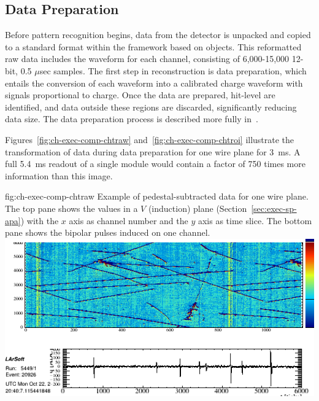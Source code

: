 \subsection{Data Preparation}

Before pattern recognition begins, data from the  detector is
unpacked and copied to a standard format within the  framework based on  objects. 
This reformatted raw data includes the waveform for each channel, consisting of 6,000-15,000  12-bit, 0.5 $\mu$sec samples. 
The first step in reconstruction is data preparation, which entails the conversion of each  waveform into a calibrated charge waveform with
signals proportional to charge. Once the data are prepared, hit-level  are identified, and data outside these regions are discarded, significantly reducing data size. The data preparation process is described more fully in~\cite{bib:docdb12349}. 

Figures~\ref{fig:ch-exec-comp-chtraw} and~\ref{fig:ch-exec-comp-chtroi} illustrate the transformation of  data  during data preparation 
for one wire plane for \SI{3}{ms}.  A full \SI{5.4}{ms} readout of a single \nominalmodsize module would contain a factor of 750 times 
more information than this image.
\begin{dunefigure}
{fig:ch-exec-comp-chtraw}
{Example of pedestal-subtracted data for one   wire plane.  The top pane shows the  values in a $V$ (induction) plane (Section~\ref{sec:exec-sp-apa}) with the $x$ axis as channel number and the $y$ axis as time slice. The bottom pane shows the bipolar pulses induced on one channel.}
\includegraphics[width=\textwidth,angle=0]{graphics/comp-evd_twq-proj_5449_20926_raw.png}
\end{dunefigure}


